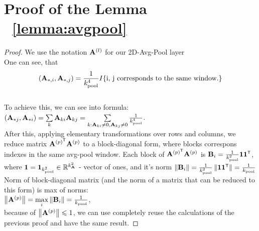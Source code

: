 \documentclass[conference]{IEEEtran}
\begin{document}
\section{Proof of the Lemma ~\ref{lemma:avgpool}}\label{app:lemma:avgpool}
\begin{proof}
    We use the notation $\mathbf{A}^{(l)}$ for our 2D-Avg-Pool layer \\
    One can see, that
    \[(\mathbf{A}_{*, i}, \mathbf{A}_{*,j}) = \frac{1}{k_{\mathrm{pool}}^4}I\{\text{i, j corresponds to the same window}.\}\] \\
    To achieve this, we can see into formula: \\
    $(\mathbf{A}_{*j}, \mathbf{A}_{*i}) = \sum\limits_{k}\mathbf{A}_{ki}\mathbf{A}_{kj} = \sum\limits_{k:\mathbf{A}_{ki} \neq 0, \mathbf{A}_{kj} \neq 0}\frac{1}{k_{\mathrm{pool}}^4}$. \\
    After this, applying elementary transformations over rows and columns, we reduce matrix $\bA^{(p)\T}\bA^{(p)}$ to a block-diagonal form, where blocks correspons indexes in the same avg-pool window. Each block of $\bA^{(p)\T}\bA^{(p)}$ is $\bB_i = \frac{1}{k_{\mathrm{pool}}^2}\mathbf{11}\T$, where $\mathbf{1} = \mathbf{1}_{k_{\mathrm{pool}}^2} \in \mathbb{R}^{k_{\mathbf{A}}^2}$ - vector of ones, and it's norm $\norm{\bB_i} = \frac{1}{k_{\mathrm{pool}}^2}\norm{\mathbf{11\T}} = \frac{1}{k_{\mathrm{pool}}}$ \\
    Norm of block-diagonal matrix (and the norm of a matrix that can be reduced to this form) is max of norms: \\
    $\left\|\mathbf{A}^{(p)}\right\| = \max\limits_{i}\left\|\mathbf{B}_{i}\right\| = \frac{1}{k_{\mathrm{pool}}}$, \\
    because of $\left\|\mathbf{A}^{(p)}\right\| \leqslant 1$, we can use completely reuse the calculations of the previous proof and have the same result.
\end{proof}
\end{document}
